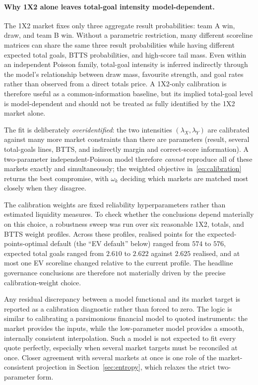\documentclass[11pt]{article}
\begin{document}
\paragraph{Why 1X2 alone leaves total-goal intensity model-dependent.} The 1X2 market fixes only
three aggregate result probabilities: team A win, draw, and team B win. Without a parametric
restriction, many different scoreline matrices can share the same three result probabilities
while having different expected total goals, BTTS probabilities, and high-score tail mass. Even
within an independent Poisson family, total-goal intensity is inferred indirectly through the
model's relationship between draw mass, favourite strength, and goal rates rather than observed
from a direct totals price. A 1X2-only calibration is therefore useful as a common-information
baseline, but its implied total-goal level is model-dependent and should not be treated as fully
identified by the 1X2 market alone.

The fit is deliberately \emph{overidentified}: the two intensities
$(\lambda_X,\lambda_Y)$ are calibrated against many more market constraints than there are
parameters (result, several total-goals lines, BTTS, and indirectly margin and
correct-score information). A two-parameter independent-Poisson model therefore
\emph{cannot} reproduce all of these markets exactly and simultaneously; the weighted
objective in~\eqref{eq:calibration} returns the best compromise, with $\omega_k$ deciding
which markets are matched most closely when they disagree. 

The calibration weights are fixed reliability hyperparameters rather than estimated liquidity measures. 
To check whether the conclusions depend materially on this choice, a robustness sweep was run over six 
reasonable 1X2, totals, and BTTS weight profiles. Across these profiles, realised points for the expected-points-optimal default (the ``EV default'' below) ranged from $574$ to $576$, expected total goals ranged from $2.610$ to $2.622$ against $2.625$ realised, and at
most one EV scoreline changed relative to the current profile. The headline governance conclusions are 
therefore not materially driven by the precise calibration-weight choice.

Any residual discrepancy between a model functional and its market target is reported as a calibration 
diagnostic rather than forced to zero. The logic is similar to calibrating a parsimonious financial model to quoted instruments: the market provides the inputs, while the low-parameter model provides a smooth, internally consistent interpolation. Such a model is not expected to fit every quote perfectly, especially when several market targets must be reconciled at once.
Closer agreement with several markets at once is one role of the market-consistent projection in 
Section~\ref{sec:entropy}, which relaxes the strict two-parameter form.
\end{document}
